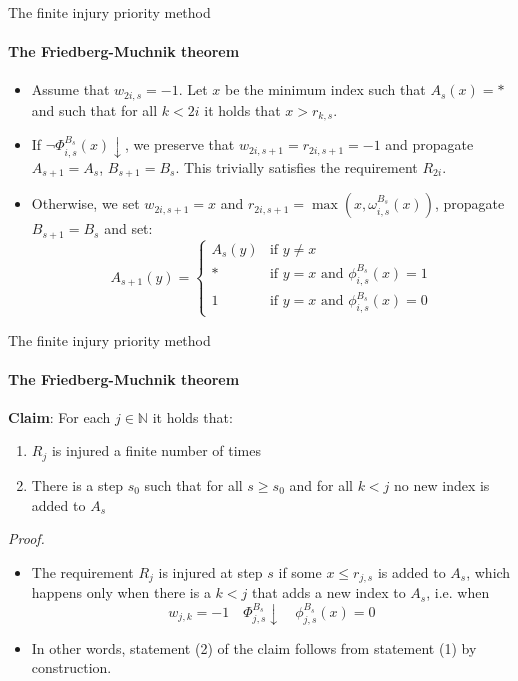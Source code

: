 \documentclass{beamer}
\newcommand{\N}{\mathbb{N}}                     %
\begin{document}
\begin{frame}{The finite injury priority method}
\framesubtitle{The Friedberg-Muchnik theorem}
    \begin{itemize}[<+->]
        \item Assume that $w_{2i,s} = -1$. Let $x$ be the minimum index such that $A_s(x) = *$ and such that for all $k < 2i$ it holds that $x > r_{k,s}$.
        \item If $\lnot \Phi_{i,s}^{B_s}(x) \downarrow$, we preserve that $w_{2i,s+1} = r_{2i,s+1} = -1$ and propagate $A_{s+1} = A_s$, $B_{s+1} = B_s$. This trivially satisfies the requirement $R_{2i}$.
        \item Otherwise, we set $w_{2i,s+1} = x$ and $r_{2i,s+1} = \max(x, \omega_{i,s}^{B_s}(x))$, propagate $B_{s+1} = B_s$ and set:
        \[A_{s+1}(y) = \left \{ \begin{array}{ll}
            A_{s}(y)  & \text{if } y \neq x \\
            * & \text{if } y = x \text{ and }  \phi_{i,s}^{B_s}(x) = 1 \\
            1 & \text{if } y = x \text{ and }  \phi_{i,s}^{B_s}(x) = 0
        \end{array}\right .\]
    \end{itemize}
\end{frame}

\begin{frame}{The finite injury priority method}
\framesubtitle{The Friedberg-Muchnik theorem}
    \textbf{Claim}: For each $j \in \N$ it holds that:
    \begin{enumerate}
        \item $R_j$ is injured a finite number of times
        \item There is a step $s_0$ such that for all $s \geq s_0$ and for all $k < j$ no new index is added to $A_s$
    \end{enumerate}

    \textit{Proof.}
    \begin{itemize}[<+->]
        \item The requirement $R_j$ is injured at step $s$ if some $x \leq r_{j,s}$ is added to $A_s$, which happens only when there is a $k < j$ that adds a new index to $A_s$, i.e. when
        \[w_{j,k} = -1 \quad \Phi_{j,s}^{B_s} \downarrow \quad \phi_{j,s}^{B_s}(x) = 0\]
        \item In other words, statement (2) of the claim follows from statement (1) by construction.
    \end{itemize}
\end{frame}
\end{document}
